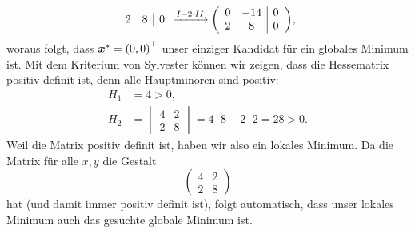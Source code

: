 \documentclass{exercise}
\begin{document}
\begin{enumerate}
\[{\begin{array}{cc|c}
				2 & 8 & 0
			\end{array}} \xrightarrow{I - 2 \cdot II} \parentheses*{\begin{array}{cc|c}
				0 & -14 & 0\\
				2 & 8 & 0
			\end{array}},
		\]
		woraus folgt, dass \(\bm{x}^* = \parentheses*{0, 0}^\top\) unser einziger Kandidat für ein globales Minimum ist.
		Mit dem Kriterium von Sylvester können wir zeigen, dass die Hessematrix positiv definit ist, denn alle Hauptminoren sind positiv:
		\begin{align*}
			H_1 &= 4 > 0,\\
			H_2 &= \begin{vmatrix}
				4 & 2\\
				2 & 8
			\end{vmatrix} = 4 \cdot 8 - 2 \cdot 2 = 28 > 0.
		\end{align*}
		Weil die Matrix positiv definit ist, haben wir also ein lokales Minimum.
		Da die Matrix für alle \(x, y\) die Gestalt
		\[
			\begin{pmatrix}
				4 & 2\\
				2 & 8
			\end{pmatrix}
		\]
		hat (und damit immer positiv definit ist), folgt automatisch, dass unser lokales Minimum auch das gesuchte globale Minimum ist.
	\end{enumerate}
\end{document}
